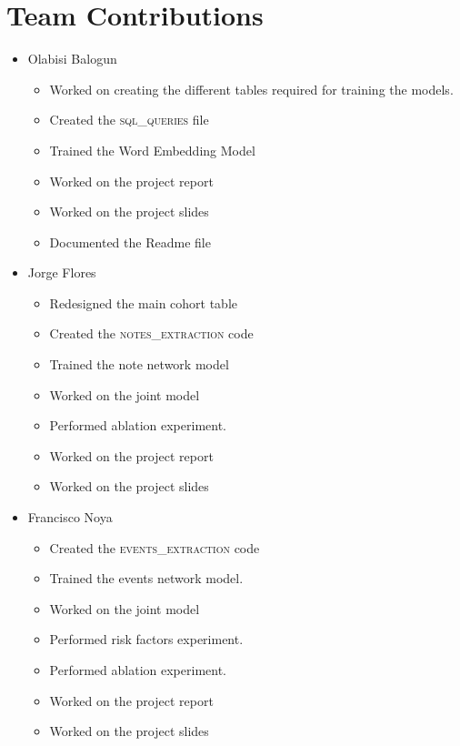 \documentclass{sigkddExp}
\begin{document}
\section{Team Contributions}
\begin{itemize}
       \item Olabisi Balogun
       \begin{itemize}
              \item Worked on creating the different tables required for training the models.
              \item Created the \textsc{sql\_queries} file
              \item Trained the Word Embedding Model
              \item Worked on the project report
              \item Worked on the project slides
              \item Documented the Readme file
       \end{itemize}
       \item Jorge Flores
       \begin{itemize}
              \item Redesigned the main cohort table
              \item Created the \textsc{notes\_extraction} code
              \item Trained the note network model
              \item Worked on the joint model
              \item Performed ablation experiment.
              \item Worked on the project report
              \item Worked on the project slides
       \end{itemize}
       \item Francisco Noya
       \begin{itemize}
              \item Created the \textsc{events\_extraction} code
              \item Trained the events network model.
              \item Worked on the joint model
              \item Performed risk factors experiment.
              \item Performed ablation experiment.
              \item Worked on the project report
              \item Worked on the project slides
       \end{itemize}
\end{itemize}
\end{document}

